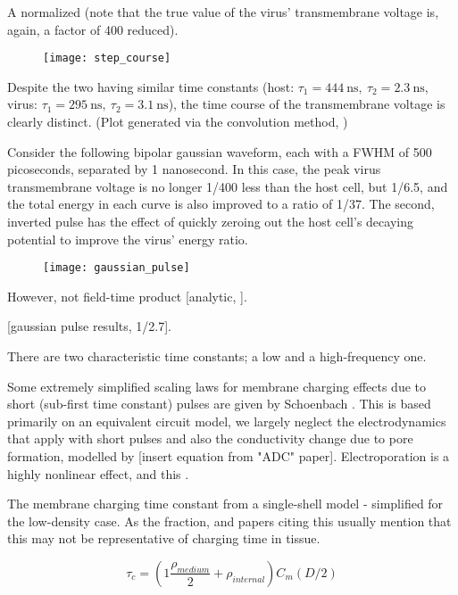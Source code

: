 \documentclass[fleqn,10pt]{paper}
\begin{document}
A normalized (note that the true value of the virus' transmembrane voltage is, again, a factor of 400 reduced).

\begin{figure}[H]
	\texttt{[image: step\_course]}
\end{figure}


Despite the two having similar time constants (host: $\tau_1=444\ \text{ns},\ \tau_2=2.3\ \text{ns}$, virus: $\tau_1=295\ \text{ns},\ \tau_2=3.1\ \text{ns}$), the time course of the transmembrane voltage is clearly distinct. (Plot generated via the convolution method, )


Consider the following bipolar gaussian waveform, each with a FWHM of 500 picoseconds, separated by 1 nanosecond. In this case, the peak virus transmembrane voltage is no longer 1/400 less than the host cell, but 1/6.5, and the total energy in each curve is also improved to a ratio of 1/37. The second, inverted pulse has the effect of quickly zeroing out the host cell's decaying potential to improve the virus' energy ratio.

\begin{figure}[H]
	\texttt{[image: gaussian\_pulse]}
\end{figure}






However, not field-time product [analytic, ]. 


[gaussian pulse results, 1/2.7]. 


There are two characteristic time constants; a low and a high-frequency one.

Some extremely simplified scaling laws for membrane charging effects due to short (sub-first time constant) pulses are given by Schoenbach \cite{Bioelectric2007}. This is based primarily on an equivalent circuit model, we largely neglect the electrodynamics that apply with short pulses and also the conductivity change due to pore formation, modelled by [insert equation from "ADC" paper]. Electroporation is a highly nonlinear effect\cite{Letter1974}, and this .

The membrane charging time constant from a single-shell model \cite{Ultrashort2004} - simplified for the low-density case. As the fraction, and papers citing this usually mention that this may not be representative of charging time in tissue.

$$\tau_c = \left(1 \frac{\rho_{medium}}{2} + \rho_{internal}\right) C_m (D/2)$$
\end{document}
